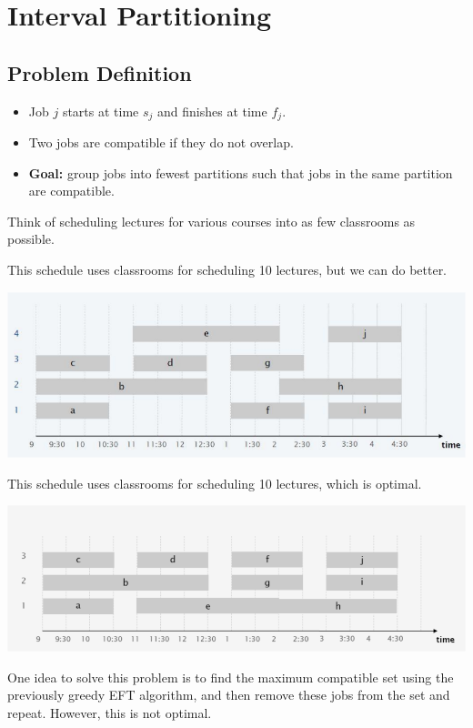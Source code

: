\section{Interval Partitioning}

\subsection{Problem Definition}

\begin{itemize}
    \item Job $j$ starts at time $s_j$ and finishes at time $f_j$.
    \item Two jobs are compatible if they do not overlap.
    \item \textbf{Goal:} group jobs into fewest partitions such that jobs in the same partition are compatible.
\end{itemize}

\begin{example}
    Think of scheduling lectures for various courses into as few classrooms as possible.

    This schedule uses  classrooms for scheduling 10 lectures, but we can do better.

    \begin{center}
        \includegraphics[width=0.55\linewidth]{figures/interval-scheduling-4-classrooms.png}
    \end{center}

    This schedule uses  classrooms for scheduling 10 lectures, which is optimal.

    \begin{center}
        \includegraphics[width=0.55\linewidth]{figures/interval-scheduling-3-classrooms.png}
    \end{center}
\end{example}

One idea to solve this problem is to find the maximum compatible set using the previously greedy EFT algorithm, and then remove these jobs from the set and repeat. However, this is not optimal.

